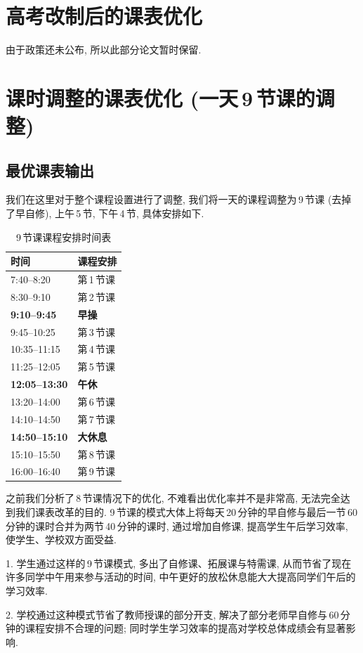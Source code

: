 \documentclass[a4paper]{article}
\begin{document}
\section{高考改制后的课表优化}
 由于政策还未公布, 所以此部分论文暂时保留.
\clearpage
\section{课时调整的课表优化 (一天\,9\,节课的调整)}
 \subsection{最优课表输出}
  我们在这里对于整个课程设置进行了调整, 我们将一天的课程调整为\,9\,节课 (去掉了早自修), 上午\,5\,节, 下午\,4\,节, 具体安排如下.
  \begin{table}[H]
  \centering
  \begin{tabular}{|l|l|}
  \hline
  \bf 时间 & \bf 课程安排 \\\hline
  7:40--8:20 & 第\,1\,节课 \\\hline
  8:30--9:10 & 第\,2\,节课 \\\hline
  \bf 9:10--9:45 & \bf 早操 \\\hline
  9:45--10:25 & 第\,3\,节课 \\\hline
  10:35--11:15 & 第\,4\,节课 \\\hline
  11:25--12:05 & 第\,5\,节课 \\\hline
  \bf 12:05--13:30 & \bf 午休 \\\hline
  13:20--14:00 & 第\,6\,节课 \\\hline
  14:10--14:50 & 第\,7\,节课 \\\hline
  \bf 14:50--15:10 & \bf 大休息 \\\hline
  15:10--15:50 & 第\,8\,节课 \\\hline
  16:00--16:40 & 第\,9\,节课 \\\hline
  \end{tabular}
  \caption{9\,节课课程安排时间表}
  \end{table}
  之前我们分析了\,8\,节课情况下的优化, 不难看出优化率并不是非常高, 无法完全达到我们课表改革的目的. 9\,节课的模式大体上将每天\,20\,分钟的早自修与最后一节\,60\,分钟的课时合并为两节\,40\,分钟的课时, 通过增加自修课, 提高学生午后学习效率, 使学生、学校双方面受益.\par
  1. 学生通过这样的\,9\,节课模式, 多出了自修课、拓展课与特需课, 从而节省了现在许多同学中午用来参与活动的时间, 中午更好的放松休息能大大提高同学们午后的学习效率.\par
  2. 学校通过这种模式节省了教师授课的部分开支, 解决了部分老师早自修与\,60\,分钟的课程安排不合理的问题; 同时学生学习效率的提高对学校总体成绩会有显著影响.\par
\end{document}
